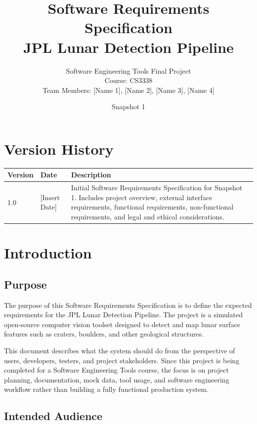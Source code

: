 \documentclass[12pt]{article}
\title{
    \textbf{Software Requirements Specification} \\
    JPL Lunar Detection Pipeline
}
\author{
    Software Engineering Tools Final Project \\
    Course: CS3338 \\
    Team Members: [Name 1], [Name 2], [Name 3], [Name 4]
}
\date{Snapshot 1}
\begin{document}
\maketitle
\newpage

\tableofcontents
\newpage

\section*{Version History}

\begin{longtable}{|p{1.5in}|p{1.5in}|p{3in}|}
\hline
\textbf{Version} & \textbf{Date} & \textbf{Description} \\
\hline
1.0 & [Insert Date] & Initial Software Requirements Specification for Snapshot 1. Includes project overview, external interface requirements, functional requirements, non-functional requirements, and legal and ethical considerations. \\
\hline
\end{longtable}

\newpage

\section{Introduction}

\subsection{Purpose}

The purpose of this Software Requirements Specification is to define the expected requirements for the JPL Lunar Detection Pipeline. The project is a simulated open-source computer vision toolset designed to detect and map lunar surface features such as craters, boulders, and other geological structures.

This document describes what the system should do from the perspective of users, developers, testers, and project stakeholders. Since this project is being completed for a Software Engineering Tools course, the focus is on project planning, documentation, mock data, tool usage, and software engineering workflow rather than building a fully functional production system.

\subsection{Intended Audience}
\end{document}
